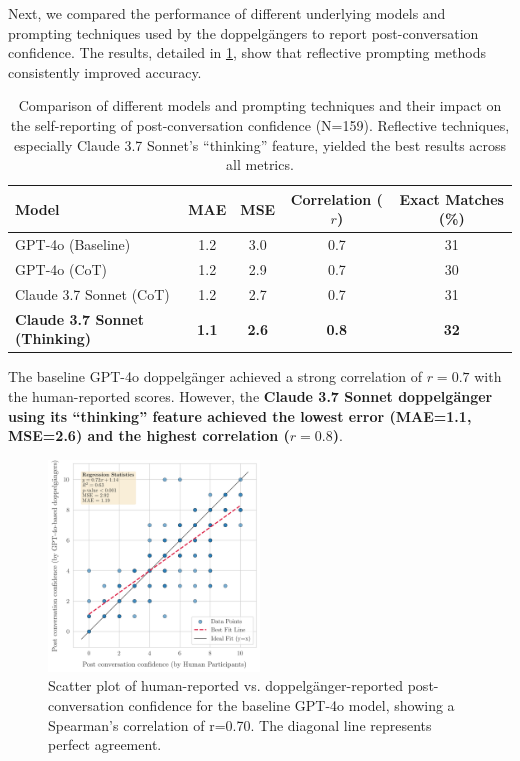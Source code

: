 Next, we compared the performance of different underlying models and prompting techniques used by the doppelgängers to report post-conversation confidence. The results, detailed in \cref{tab:model_comparison}, show that reflective prompting methods consistently improved accuracy.


\begin{table}[!ht]
\centering
\begin{tabular}{l|cccc}
\toprule
\textbf{Model} & \textbf{MAE} & \textbf{MSE} & \textbf{Correlation ($r$)} & \textbf{Exact Matches (\%)} \\
\midrule
GPT-4o (Baseline) & 1.2 & 3.0 & 0.7 & 31
\\
GPT-4o (CoT) & 1.2 & 2.9 & 0.7 & 30 \\
Claude 3.7 Sonnet (CoT) & 1.2 & 2.7 & 0.7 & 31 \\
\textbf{Claude 3.7 Sonnet (Thinking)} & \textbf{1.1} & \textbf{2.6} & \textbf{0.8} & \textbf{32} \\ 
\bottomrule
\end{tabular}
\caption[Effect LLM type an reasoning on synthetic smokers' self-reported confidence.]{Comparison of different models and prompting techniques and their impact on the self-reporting of post-conversation confidence (N=159). Reflective techniques, especially Claude 3.7 Sonnet's ``thinking'' feature, yielded the best results across all metrics.}
\label{tab:model_comparison}
\end{table}

The baseline GPT-4o doppelgänger achieved a strong correlation of \textbf{$r=0.7$} with the human-reported scores. However, the \textbf{Claude 3.7 Sonnet doppelgänger using its ``thinking'' feature achieved the lowest error (MAE=1.1, MSE=2.6) and the highest correlation ($r=0.8$)}.


\begin{figure}[htpb]
    \centering
    \includegraphics[width=0.5\textwidth]{fig/post_conf_gpt4o_vs_human.png}
    \caption{Scatter plot of human-reported vs. doppelgänger-reported post-conversation confidence for the baseline GPT-4o model, showing a Spearman's correlation of r=0.70. The diagonal line represents perfect agreement.}
    \label{fig:post-conf-gpt4o-vs-human}
\end{figure}



